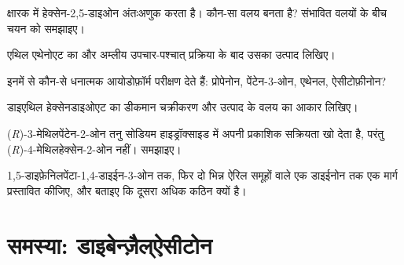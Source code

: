 \begin{exercise}[$\star\star$]\label{exo:b2:enolates-aldol:7}
क्षारक में हेक्सेन-2,5-डाइओन अंतःअणुक  करता है। कौन-सा वलय बनता है? संभावित वलयों के
बीच चयन को समझाइए।
\end{exercise}

\begin{exercise}[$\star\star$]\label{exo:b2:enolates-aldol:8}
एथिल एथेनोएट का  और अम्लीय उपचार-पश्चात् प्रक्रिया के बाद उसका उत्पाद लिखिए।
\end{exercise}

\begin{exercise}[$\star\star$]\label{exo:b2:enolates-aldol:9}
इनमें से कौन-से धनात्मक आयोडोफ़ॉर्म परीक्षण देते हैं: प्रोपेनोन, पेंटेन-3-ओन, एथेनल, ऐसीटोफ़ीनोन?
\end{exercise}

\begin{exercise}[$\star\star\star$]\label{exo:b2:enolates-aldol:10}
डाइएथिल हेक्सेनडाइओएट का डीकमान चक्रीकरण और उत्पाद के वलय का आकार लिखिए।
\end{exercise}

\begin{exercise}[$\star\star\star$]\label{exo:b2:enolates-aldol:11}
(\textit{R})-3-मेथिलपेंटेन-2-ओन तनु सोडियम हाइड्रॉक्साइड में अपनी प्रकाशिक सक्रियता खो देता है, परंतु
(\textit{R})-4-मेथिलहेक्सेन-2-ओन नहीं। समझाइए।
\end{exercise}

\begin{exercise}[$\star\star\star$]\label{exo:b2:enolates-aldol:12}
1,5-डाइफ़ेनिलपेंटा-1,4-डाइईन-3-ओन तक, फिर दो भिन्न ऐरिल समूहों वाले एक डाइईनोन तक एक मार्ग प्रस्तावित कीजिए,
और बताइए कि दूसरा अधिक कठिन क्यों है।
\end{exercise}

\section{समस्या: डाइबेन्ज़ैल्ऐसीटोन}

